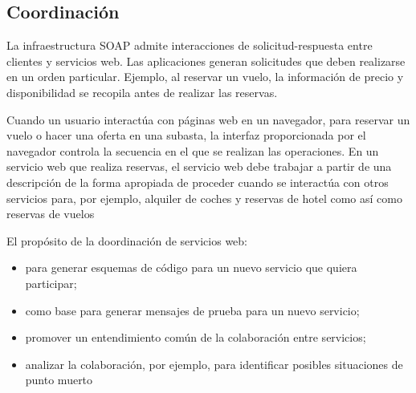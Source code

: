  \subsection{Coordinación}
 
 	  La infraestructura SOAP admite interacciones  de solicitud-respuesta entre clientes y servicios web.  Las aplicaciones  generan solicitudes que deben realizarse en un orden particular. 
 	 Ejemplo, al reservar un vuelo, la información de precio y disponibilidad se recopila antes de realizar las reservas. 
 
		 Cuando un usuario interactúa con páginas web en un navegador, para reservar un vuelo o hacer una oferta en una subasta, la interfaz proporcionada por el navegador controla la secuencia en el que se realizan las operaciones.
		 En un servicio web que realiza reservas, el servicio web debe trabajar a partir de una descripción de la forma apropiada de proceder cuando se interactúa con otros servicios para, por ejemplo, alquiler de coches y reservas de hotel como así como reservas de vuelos
 
 
 	El prop\'osito de la doordinación de servicios web:
	\begin{itemize} 
		\item para generar esquemas de código para un nuevo servicio que quiera participar;
		\item como base para generar mensajes de prueba para un nuevo servicio;
		\item promover un entendimiento común de la colaboración entre servicios;
		\item analizar la colaboración, por ejemplo, para identificar posibles situaciones de punto muerto
	\end{itemize}

